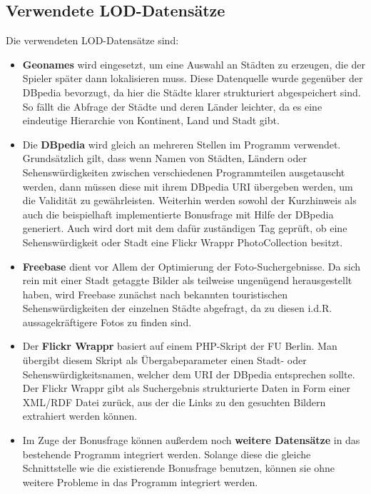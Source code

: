 \documentclass[a4paper, 11pt]{article}
\begin{document}
\subsection{Verwendete LOD-Datensätze}
Die verwendeten LOD-Datensätze sind:
\begin{itemize}
\item \textbf{Geonames} wird eingesetzt, um eine Auswahl an Städten zu erzeugen, die der Spieler später dann lokalisieren muss. Diese Datenquelle wurde gegenüber der DBpedia bevorzugt, da hier die Städte klarer strukturiert abgespeichert sind. So fällt die Abfrage der Städte und deren Länder leichter, da es eine eindeutige Hierarchie von Kontinent, Land und Stadt gibt. 
\item Die \textbf{DBpedia} wird gleich an mehreren Stellen im Programm verwendet. Grundsätzlich gilt, dass wenn Namen von Städten, Ländern oder Sehenswürdigkeiten zwischen verschiedenen Programmteilen ausgetauscht werden, dann müssen diese mit ihrem DBpedia URI übergeben werden, um die Validität zu gewährleisten. Weiterhin werden sowohl der Kurzhinweis als auch die beispielhaft implementierte Bonusfrage mit Hilfe der DBpedia generiert. Auch wird dort mit dem dafür zuständigen Tag geprüft, ob eine Sehenswürdigkeit oder Stadt eine Flickr Wrappr PhotoCollection besitzt.
\item \textbf{Freebase} dient vor Allem der Optimierung der Foto-Suchergebnisse. Da sich rein mit einer Stadt getaggte Bilder als teilweise ungenügend herausgestellt haben, wird Freebase zunächst nach bekannten touristischen Sehenswürdigkeiten der einzelnen Städte abgefragt, da zu diesen i.d.R. aussagekräftigere Fotos zu finden sind.
\item Der \textbf{Flickr Wrappr} basiert auf einem PHP-Skript der FU Berlin. Man übergibt diesem Skript als Übergabeparameter einen Stadt- oder Sehenswürdigkeitsnamen, welcher dem URI der DBpedia entsprechen sollte. Der Flickr Wrappr gibt als Suchergebnis strukturierte Daten in Form einer XML/RDF Datei zurück, aus der die Links zu den gesuchten Bildern extrahiert werden können.
\item Im Zuge der Bonusfrage können außerdem noch \textbf{weitere Datensätze} in das bestehende Programm integriert werden. Solange diese die gleiche Schnittstelle wie die existierende Bonusfrage benutzen, können sie ohne weitere Probleme in das Programm integriert werden.
\end{itemize}
\end{document}
